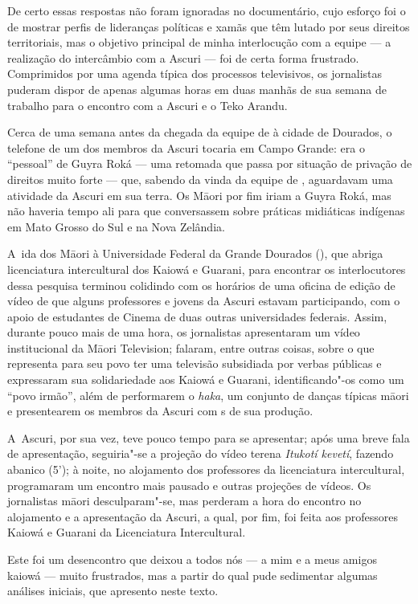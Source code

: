 De certo essas respostas não foram ignoradas no documentário, cujo
esforço foi o de mostrar perfis de lideranças políticas e xamãs que têm
lutado por seus direitos territoriais, mas o objetivo principal de
minha interlocução com a equipe --- a realização do intercâmbio com a
Ascuri --- foi de certa forma frustrado. Comprimidos por uma agenda
típica dos processos televisivos, os jornalistas puderam dispor de
apenas algumas horas em duas manhãs de sua semana de trabalho para o
encontro com a Ascuri e o Teko Arandu.

Cerca de uma semana antes da chegada da equipe de  à cidade de
Dourados, o telefone de um dos membros da Ascuri tocaria em Campo
Grande: era o ``pessoal'' de Guyra Roká --- uma retomada que passa por
situação de privação de direitos muito forte --- que, sabendo da vinda da
equipe de , aguardavam uma atividade da Ascuri em sua terra. Os
M\=aori por fim iriam a Guyra Roká, mas não haveria tempo ali para que
conversassem sobre práticas midiáticas indígenas em Mato Grosso do Sul
e na Nova Zelândia. 

A~ida dos M\=aori à Universidade Federal da Grande Dourados (), que
abriga licenciatura intercultural dos Kaiowá e Guarani, para encontrar
os interlocutores dessa pesquisa terminou colidindo com os horários de
uma oficina de edição de vídeo de que alguns professores e jovens da
Ascuri estavam participando, com o apoio de estudantes de Cinema de
duas outras universidades federais. Assim, durante pouco mais de uma
hora, os jornalistas apresentaram um vídeo institucional da M\=aori
Television; falaram, entre outras coisas, sobre o que representa para
seu povo ter uma televisão subsidiada por verbas públicas e expressaram
sua solidariedade aos Kaiowá e Guarani, identificando"-os como um ``povo
irmão'', além de performarem o \emph{haka}, um conjunto de danças típicas
m\=aori e presentearem os membros da Ascuri com s de sua produção. 

A~Ascuri, por sua vez, teve pouco tempo para se apresentar; após uma
breve fala de apresentação, seguiria"-se a projeção do vídeo terena
\emph{Itukotí kevetí}, fazendo abanico (5’); à noite, no alojamento dos
professores da licenciatura intercultural, programaram um encontro mais
pausado e outras projeções de vídeos. Os jornalistas m\=aori
desculparam"-se, mas perderam a hora do encontro no alojamento e a
apresentação da Ascuri, a qual, por fim, foi feita aos professores
Kaiowá e Guarani da Licenciatura Intercultural. 

Este foi um desencontro que deixou a todos nós --- a mim e a meus amigos
kaiowá --- muito frustrados, mas a partir do qual pude sedimentar algumas
análises iniciais, que apresento neste texto. 

